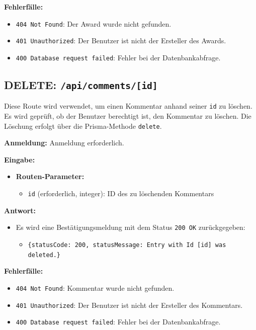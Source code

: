 \documentclass[a4paper,12pt]{article}
\begin{document}
\textbf{Fehlerfälle:}
\begin{itemize}
    \item \texttt{404 Not Found}: Der Award wurde nicht gefunden.
    \item \texttt{401 Unauthorized}: Der Benutzer ist nicht der Ersteller des Awards.
    \item \texttt{400 Database request failed}: Fehler bei der Datenbankabfrage.
\end{itemize}

\newpage
\subsection{DELETE: \texttt{/api/comments/[id]}}

Diese Route wird verwendet, um einen Kommentar anhand seiner \texttt{id} zu löschen. Es wird geprüft, ob der Benutzer berechtigt ist, den Kommentar zu löschen. Die Löschung erfolgt über die Prisma-Methode \texttt{delete}.

\textbf{Anmeldung:} Anmeldung erforderlich.

\textbf{Eingabe:}
\begin{itemize}
    \item \textbf{Routen-Parameter:}
    \begin{itemize}
        \item \texttt{id} (erforderlich, integer): ID des zu löschenden Kommentars
    \end{itemize}
\end{itemize}

\textbf{Antwort:}
\begin{itemize}
    \item Es wird eine Bestätigungsmeldung mit dem Status \texttt{200 OK} zurückgegeben:
    \begin{itemize}
        \item \texttt{\{statusCode: 200, statusMessage: Entry with Id [id] was deleted.\}}
    \end{itemize}
\end{itemize}

\textbf{Fehlerfälle:}
\begin{itemize}
    \item \texttt{404 Not Found}: Kommentar wurde nicht gefunden.
    \item \texttt{401 Unauthorized}: Der Benutzer ist nicht der Ersteller des Kommentars.
    \item \texttt{400 Database request failed}: Fehler bei der Datenbankabfrage.
\end{itemize}
\end{document}
